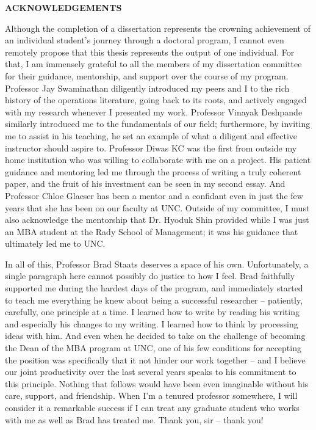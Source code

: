 
\begin{center}
\vspace*{52pt}
{\normalfont \textbf{ACKNOWLEDGEMENTS}} \\
\end{center}
Although the completion of a dissertation represents the crowning achievement of an individual student’s journey through a doctoral program, I cannot even remotely propose that this thesis represents the output of one individual. For that, I am immensely grateful to all the members of my dissertation committee for their guidance, mentorship, and support over the course of my program. Professor Jay Swaminathan diligently introduced my peers and I to the rich history of the operations literature, going back to its roots, and actively engaged with my research whenever I presented my work. Professor Vinayak Deshpande similarly introduced me to the fundamentals of our field; furthermore, by inviting me to assist in his teaching, he set an example of what a diligent and effective instructor should aspire to. Professor Diwas KC was the first from outside my home institution who was willing to collaborate with me on a project. His patient guidance and mentoring led me through the process of writing a truly coherent paper, and the fruit of his investment can be seen in my second essay. And Professor Chloe Glaeser has been a mentor and a confidant even in just the few years that she has been on our faculty at UNC. Outside of my committee, I must also acknowledge the mentorship that Dr. Hyoduk Shin provided while I was just an MBA student at the Rady School of Management; it was his guidance that ultimately led me to UNC.

In all of this, Professor Brad Staats deserves a space of his own. Unfortunately, a single paragraph here cannot possibly do justice to how I feel. Brad faithfully supported me during the hardest days of the program, and immediately started to teach me everything he knew about being a successful researcher – patiently, carefully, one principle at a time. I learned how to write by reading his writing and especially his changes to my writing. I learned how to think by processing ideas with him. And even when he decided to take on the challenge of becoming the Dean of the MBA program at UNC, one of his few conditions for accepting the position was specifically that it not hinder our work together – and I believe our joint productivity over the last several years speaks to his commitment to this principle. Nothing that follows would have been even imaginable without his care, support, and friendship. When I’m a tenured professor somewhere, I will consider it a remarkable success if I can treat any graduate student who works with me as well as Brad has treated me. Thank you, sir – thank you!

